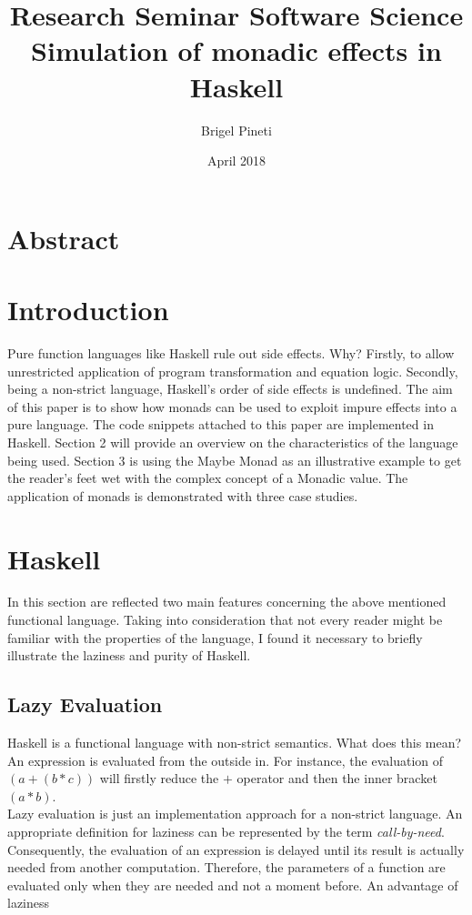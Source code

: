 \documentclass[a4paper, twocolumn]{article}
\title{\Large{Research Seminar Software Science} \\
\huge{Simulation of monadic effects in Haskell}}
\author{Brigel Pineti}
\date{April 2018}
\begin{document}
\maketitle

\section*{Abstract}

\section{Introduction}

Pure function languages like Haskell rule out side effects. Why? Firstly, to allow unrestricted application of program transformation and equation logic. Secondly, being a non-strict language, Haskell's order of side effects is undefined. The aim of this paper is to show how monads can be used to exploit impure effects into a pure language. The code snippets attached to this paper are implemented in Haskell. Section 2 will provide an overview on the characteristics of the language being used. Section 3 is using the Maybe Monad as an illustrative example to get the reader's feet wet with the complex concept of a Monadic value. The application of monads is demonstrated with three case studies.

\section{Haskell}

In this section are reflected two main features concerning the above mentioned functional language. Taking into consideration that not every reader might be familiar with the properties of the language, I found it necessary to briefly illustrate the laziness and purity of Haskell.  

\subsection{Lazy Evaluation}

Haskell is a functional language with non-strict semantics. What does this mean? An expression is evaluated from the outside in. For instance, the evaluation of \textit{$(a + (b * c))$} will firstly reduce the \textit{$+$} operator and then the inner bracket \textit{$(a * b)$}. \\
Lazy evaluation is just an implementation approach for a non-strict language. An appropriate definition for laziness can be represented by the term \textit{call-by-need}. Consequently, the evaluation of an expression is delayed until its result is actually needed from another computation. Therefore, the parameters of a function are evaluated only when they are needed and not a moment before. An advantage of laziness 
\end{document}
